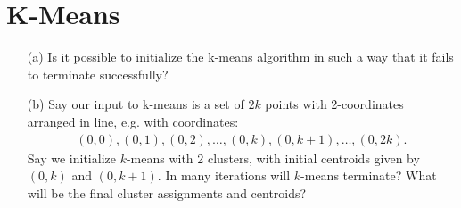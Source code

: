 \documentclass[11pt]{article}
\begin{document}

\section*{K-Means}

\begin{enumerate}
\item[(a)] Is it possible to initialize the k-means algorithm in such a way that it fails to terminate successfully?

\item[(b)] Say our input to k-means is a set of $2k$ points with 2-coordinates arranged in line, e.g. with coordinates:
{\small
\begin{align*}
(0,0), (0,1), (0, 2), \ldots, (0,k), (0,k+1), \ldots, (0,2k).
\end{align*}
}
Say we initialize $k$-means with 2 clusters, with initial centroids given by $(0,k)$ and $(0,k+1)$.  In many iterations will $k$-means terminate?  What will be the final cluster assignments and centroids?
\end{enumerate}
\end{document}
